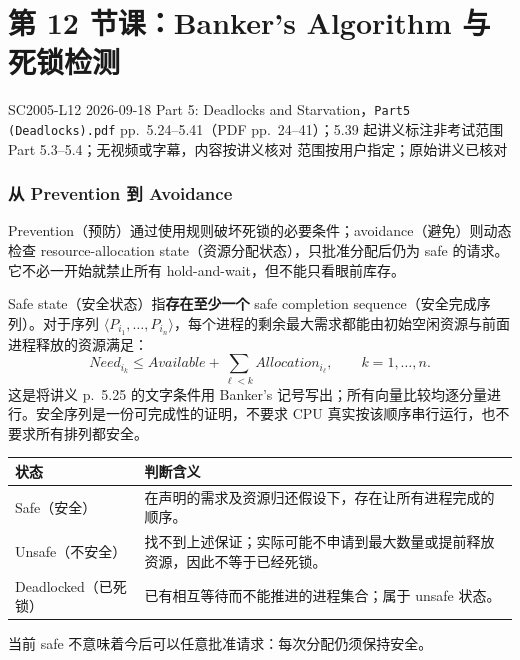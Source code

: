 
\section{第 12 节课：Banker's Algorithm 与死锁检测}
\label{lecture:SC2005-L12}

\lecturemeta
  {SC2005-L12}
  {2026-09-18}
  {Part 5: Deadlocks and Starvation，\texttt{Part5 (Deadlocks).pdf}}
  {pp.~5.24--5.41（PDF pp.~24--41）；5.39 起讲义标注非考试范围}
  {Part 5.3--5.4；无视频或字幕，内容按讲义核对}
  {范围按用户指定；原始讲义已核对}



\subsubsection{从 Prevention 到 Avoidance}

Prevention（预防）通过使用规则破坏死锁的必要条件；avoidance（避免）则动态检查 resource-allocation state（资源分配状态），只批准分配后仍为 safe 的请求。它不必一开始就禁止所有 hold-and-wait，但不能只看眼前库存。

Safe state（安全状态）指\textbf{存在至少一个} safe completion sequence（安全完成序列）。对于序列 $\langle P_{i_1},\ldots,P_{i_n}\rangle$，每个进程的剩余最大需求都能由初始空闲资源与前面进程释放的资源满足：
\[
  Need_{i_k}\le Available+\sum_{\ell<k}Allocation_{i_\ell},
  \qquad k=1,\ldots,n.
\]
这是将讲义 p.~5.25 的文字条件用 Banker's 记号写出；所有向量比较均逐分量进行。安全序列是一份可完成性的证明，不要求 CPU 真实按该顺序串行运行，也不要求所有排列都安全。

\begin{center}
\begin{tabularx}{\textwidth}{@{}p{3.3cm}X@{}}
  \toprule
  状态 & 判断含义 \\
  \midrule
  Safe（安全） & 在声明的需求及资源归还假设下，存在让所有进程完成的顺序。 \\
  Unsafe（不安全） & 找不到上述保证；实际可能不申请到最大数量或提前释放资源，因此不等于已经死锁。 \\
  Deadlocked（已死锁） & 已有相互等待而不能推进的进程集合；属于 unsafe 状态。 \\
  \bottomrule
\end{tabularx}
\end{center}
当前 safe 不意味着今后可以任意批准请求：每次分配仍须保持安全。

